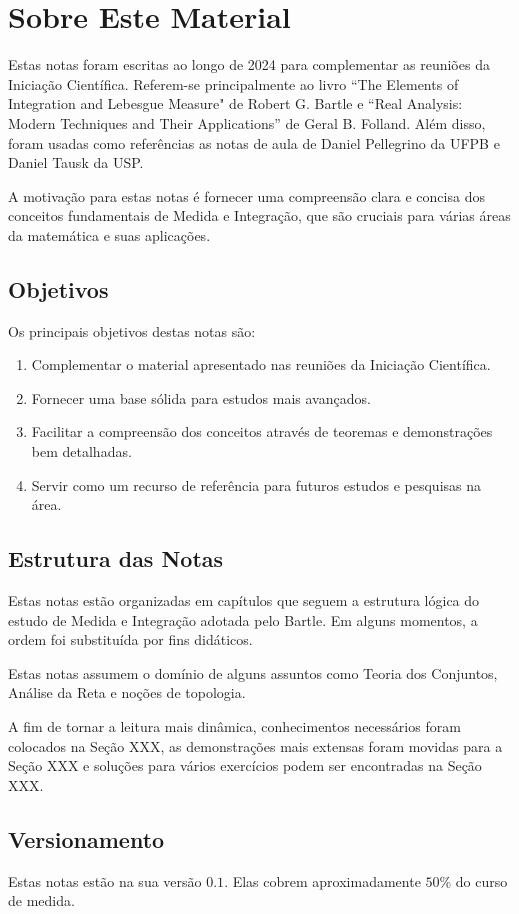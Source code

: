 \chapter*{Sobre Este Material}

Estas notas foram escritas ao longo de 2024 para complementar as reuniões da Iniciação Científica. Referem-se principalmente ao livro ``The Elements of Integration and Lebesgue Measure" de Robert G. Bartle e ``Real Analysis: Modern Techniques and Their Applications'' de Geral B. Folland. Além disso, foram usadas como referências as notas de aula de Daniel Pellegrino da UFPB e Daniel Tausk da USP.

A motivação para estas notas é fornecer uma compreensão clara e concisa dos conceitos fundamentais de Medida e Integração, que são cruciais para várias áreas da matemática e suas aplicações.

\section*{Objetivos}

Os principais objetivos destas notas são:

\begin{enumerate}
    \item Complementar o material apresentado nas reuniões da Iniciação Científica.
    \item Fornecer uma base sólida para estudos mais avançados.
    \item Facilitar a compreensão dos conceitos através de teoremas e demonstrações bem detalhadas.
    \item Servir como um recurso de referência para futuros estudos e pesquisas na área.
\end{enumerate}

\section*{Estrutura das Notas}

Estas notas estão organizadas em capítulos que seguem a estrutura lógica do estudo de Medida e Integração adotada pelo Bartle. Em alguns momentos, a ordem foi substituída por fins didáticos.

Estas notas assumem o domínio de alguns assuntos como Teoria dos Conjuntos, Análise da Reta e noções de topologia.

A fim de tornar a leitura mais dinâmica, conhecimentos necessários foram colocados na Seção XXX, as demonstrações mais extensas foram movidas para a Seção XXX e soluções para vários exercícios podem ser encontradas na Seção XXX.

\section*{Versionamento}
Estas notas estão na sua versão $0.1$. Elas cobrem aproximadamente $50$\% do curso de medida.
